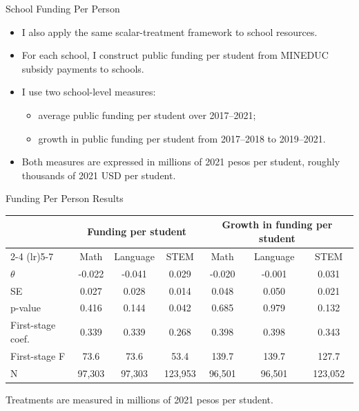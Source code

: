\documentclass[notes,11pt,aspectratio=169]{beamer}
\newenvironment{wideitemize}{%
  \begin{minipage}{0.90\textwidth}
  \begin{itemize}
  \addtolength{\itemsep}{1em}
}{%
  \end{itemize}
  \end{minipage}
}
\begin{document}
\begin{frame}{School Funding Per Person}
\begin{wideitemize}
  \item I also apply the same scalar-treatment framework to school resources.

  \item For each school, I construct public funding per student from MINEDUC subsidy payments to schools.

  \item I use two school-level measures:
  \begin{itemize}
    \item average public funding per student over 2017--2021;
    \item growth in public funding per student from 2017--2018 to 2019--2021.
  \end{itemize}

  \item Both measures are expressed in millions of 2021 pesos per student, roughly thousands of 2021 USD per student.
\end{wideitemize}
\end{frame}

\begin{frame}{Funding Per Person Results}
\centering
\scriptsize
\begin{tabular}{lcccccc}
\toprule
 & \multicolumn{3}{c}{Funding per student} & \multicolumn{3}{c}{Growth in funding per student} \\
\cmidrule(lr){2-4} \cmidrule(lr){5-7}
 & Math & Language & STEM & Math & Language & STEM \\
\midrule
\(\theta\) & -0.022 & -0.041 & 0.029 & -0.020 & -0.001 & 0.031 \\
SE & 0.027 & 0.028 & 0.014 & 0.048 & 0.050 & 0.021 \\
p-value & 0.416 & 0.144 & 0.042 & 0.685 & 0.979 & 0.132 \\
\midrule
First-stage coef. & 0.339 & 0.339 & 0.268 & 0.398 & 0.398 & 0.343 \\
First-stage F & 73.6 & 73.6 & 53.4 & 139.7 & 139.7 & 127.7 \\
N & 97,303 & 97,303 & 123,953 & 96,501 & 96,501 & 123,052 \\
\bottomrule
\end{tabular}

\vspace{0.7em}
\footnotesize
Treatments are measured in millions of 2021 pesos per student.
\end{frame}
\end{document}
